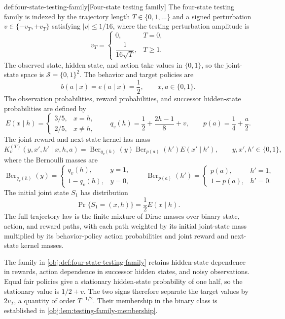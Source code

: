 \documentclass[11pt]{article}
\begin{document}
\begin{definitionv}{def:four-state-testing-family}[Four-state testing family]
The four-state testing family is indexed by the trajectory length \(T\in\{0,1,\ldots\}\) and a signed perturbation \(v\in\{-v_T,+v_T\}\) satisfying \(|v|\le 1/16\), where the testing perturbation amplitude is
\[
v_T=
\begin{cases}
0,&T=0,\\
\dfrac{1}{16\sqrt T},&T\ge 1.
\end{cases}
\]
The observed state, hidden state, and action take values in \(\{0,1\}\), so the joint-state space is \(\mathcal S=\{0,1\}^2\). The behavior and target policies are
\[
b(a\mid x)=e(a\mid x)=\frac12,
\qquad x,a\in\{0,1\}.
\]
The observation probabilities, reward probabilities, and successor hidden-state probabilities are defined by
\[
E(x\mid h)=
\begin{cases}
3/5,&x=h,\\
2/5,&x\ne h,
\end{cases}
\qquad
q_v(h)=\frac12+\frac{2h-1}{8}+v,
\qquad
p(a)=\frac14+\frac a2.
\]
The joint reward and next-state kernel has mass
\[
K_v^{(T)}(y,x',h'\mid x,h,a)
=
\operatorname{Ber}_{q_v(h)}(y)
\operatorname{Ber}_{p(a)}(h')
E(x'\mid h'),
\qquad y,x',h'\in\{0,1\},
\]
where the Bernoulli masses are
\[
\operatorname{Ber}_{q_v(h)}(y)=
\begin{cases}
q_v(h),&y=1,\\
1-q_v(h),&y=0,
\end{cases}
\qquad
\operatorname{Ber}_{p(a)}(h')=
\begin{cases}
p(a),&h'=1,\\
1-p(a),&h'=0.
\end{cases}
\]
The initial joint state \(S_1\) has distribution
\[
\Pr\{S_1=(x,h)\}=\frac12 E(x\mid h).
\]
The full trajectory law is the finite mixture of Dirac masses over binary state, action, and reward paths, with each path weighted by its initial joint-state mass multiplied by its behavior-policy action probabilities and joint reward and next-state kernel masses.
\end{definitionv}

The family in \cref{obj:def:four-state-testing-family} retains hidden-state dependence in rewards, action dependence in successor hidden states, and noisy observations. Equal fair policies give a stationary hidden-state probability of one half, so the stationary value is \(1/2+v\). The two signs therefore separate the target values by \(2v_T\), a quantity of order \(T^{-1/2}\). Their membership in the binary class is established in \cref{obj:lem:testing-family-membership}.
\end{document}
